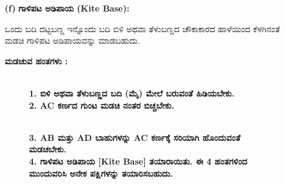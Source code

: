 \begin{enumerate}
\item[{\bf (f)}] \textbf{ಗಾಳಿಪಟ ಅಡಿಪಾಯ (Kite Base):}

ಒಂದು ಬದಿ ದಟ್ಟಬಣ್ಣ ಇನ್ನೊಂದು ಬದಿ ಬಿಳಿ ಅಥವಾ ತೆಳುಬಣ್ಣದ ಚೌಕಾಕಾರದ ಹಾಳೆಯಿಂದ ಕೆಳಗಿನಂತೆ ಮಡಚಿ ಗಾಳಿಪಟ ಅಡಿಪಾಯವನ್ನು ಮಾಡಬಹುದು. 

\noindent
\textbf{ಮಡಚುವ ಹಂತಗಳು :}
\begin{figure}[H]
\\
\textbf{1. ಬಿಳಿ ಅಥವಾ ತೆಳುಬಣ್ಣದ ಬದಿ (ಮೈ) ಮೇಲೆ ಬರುವಂತೆ ಹಿಡಿಯಬೇಕು.}\\
\textbf{2. AC ಕರ್ಣದ ಗುಂಟ ಮಡಚಿ ನಂತರ ಬಿಚ್ಚಬೇಕು.}
\end{figure}
\vfill\eject


\begin{figure}[H]
\\
\textbf{3. AB ಮತ್ತು AD ಬಾಹುಗಳನ್ನು  AC ಕರ್ಣಕ್ಕೆ ಸರಿಯಾಗಿ ಹೊಂದುವಂತೆ ಮಡಚಬೇಕು.}\\
\textbf{4. ಗಾಳಿಪಟ ಅಡಿಪಾಯ [Kite Base] ತಯಾರಾಯಿತು. ಈ 4 ಹಂತಗಳಿಂದ ಮುಂದುವರಿಸಿ ಅನೇಕ ಪಕ್ಷಿಗಳನ್ನು ತಯಾರಿಸಬಹುದು.}
\end{figure}
\end{enumerate}

